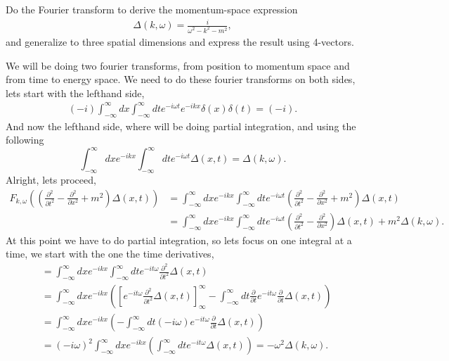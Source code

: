 \documentclass[working, oneside]{../../Preambles/tuftebook}
\begin{document}
\begin{exercise}[3]
Do the Fourier transform to derive the momentum-space expression
\begin{align*}
\Delta(k, \omega) = \frac{i}{\omega^2 - k^2 - m^2},
\end{align*}
and generalize to three spatial dimensions and express the result using 4-vectors.
\end{exercise}
We will be doing two fourier transforms, from position to momentum space and from time to energy space. We need to do these fourier transforms on both sides, lets start with the lefthand side,
\begin{align*}
    \left( -i \right) \int_{-\infty}^{\infty} dx \int_{-\infty}^{\infty} dt e^{-i \omega t}e^{-ikx}\delta\left( x \right) \delta\left( t \right) = \left( -i \right)  
.\end{align*}
And now the lefthand side, where will be doing partial integration, and using the following
\[
\int_{-\infty}^{\infty} dx e^{-ikx}\int_{-\infty}^{\infty} dte^{-i\omega t} \Delta\left( x,t \right) = \Delta \left( k, \omega \right)   
.\] 
Alright, lets proceed,
\begin{align*}
    F_{k, \omega} \left( \left( \frac{\partial ^2}{\partial t^2} - \frac{\partial ^2}{\partial x^2} +m^2 \right) \Delta\left( x, t \right)  \right) &=  \int_{-\infty}^{\infty} dx e^{-ikx}\int_{-\infty}^{\infty} dte^{-i\omega t} \left( \frac{\partial ^2}{\partial t^2} - \frac{\partial ^2}{\partial x^2} +m^2 \right) \Delta\left( x,t \right) \\
    &=\int_{-\infty}^{\infty} dx e^{-ikx}\int_{-\infty}^{\infty} dte^{-i\omega t} \left( \frac{\partial ^2}{\partial t^2} - \frac{\partial ^2}{\partial x^2} \right) \Delta\left( x,t \right) + m^2\Delta\left( k, \omega \right)
.\end{align*}
At this point we have to do partial integration, so lets focus on one integral at a time, we start with the one the time derivatives,
\begin{align*}
    &=\int_{-\infty}^{\infty} dxe^{-ikx}\int_{-\infty}^{\infty} dte^{-it\omega}\frac{\partial ^2}{\partial t^2} \Delta\left( x,t \right) \\
    &=\int_{-\infty}^{\infty} dxe^{-ikx}\left(\left[ e^{-it\omega} \frac{\partial ^2}{\partial t^2} \Delta\left( x,t \right)  \right]^{\infty}_{\infty} -  \int_{-\infty}^{\infty} dt \frac{\partial }{\partial t} e^{-it\omega}\frac{\partial }{\partial t} \Delta\left( x,t \right) \right)\\
    &=\int_{-\infty}^{\infty} dxe^{-ikx}\left(-\int_{-\infty}^{\infty} dt \left( -i\omega \right) e^{-it\omega}\frac{\partial }{\partial t} \Delta\left( x,t \right) \right)\\
    &= \left( -i\omega \right)^2\int_{-\infty}^{\infty} dxe^{-ikx}\left(\int_{-\infty}^{\infty} dt e^{-it\omega} \Delta\left( x,t \right) \right) = -\omega^2 \Delta\left( k, \omega \right) 
.\end{align*}
\end{document}
